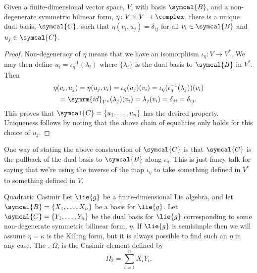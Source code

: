 \documentclass[fleqn]{NotesClass}
\newcommand{\id}{\symrm{id}}
\newcommand{\basis}{\symcal{B}}
\begin{document}
    \begin{lma}{}{}
        Given a finite-dimensional vector space, \(V\), with basis \(\basis\), and a non-degenerate symmetric bilinear form, \(\eta \colon V\times V \to \complex\), there is a unique dual basis, \(\symcal{C}\), such that \(\eta(v_i, u_j) = \delta_{ij}\) for all \(v_i \in \basis\) and \(u_j \in \symcal{C}\).
        \begin{proof}
            Non-degeneracy of \(\eta\) means that we have an isomorphism \(\iota_\eta \colon V \to V^*\).
            We may then define \(u_i = \iota_\eta^{-1}(\lambda_i)\) where \(\{\lambda_i\}\) is the dual basis to \(\basis\) in \(V^*\).
            Then
            \begin{multline}
                \eta(v_i, u_j) = \eta(u_j, v_i) = \iota_\eta(u_j)(v_i) = \iota_\eta(\iota_\eta^{-1}(\lambda_j))(v_i)\\
                = \id_{V^*}(\lambda_j)(v_i) = \lambda_j(v_i) = \delta_{ji} = \delta_{ij}.  
            \end{multline}
            This proves that \(\symcal{C} = \{u_1, \dotsc, u_n\}\) has the desired property.
            Uniqueness follows by noting that the above chain of equalities only holds for this choice of \(u_j\).
        \end{proof}
    \end{lma}
    
    One way of stating the above construction of \(\symcal{C}\) is that \(\symcal{C}\) is the pullback of the dual basis to \(\basis\) along \(\iota_\eta\).
    This is just fancy talk for saying that we're using the inverse of the map \(\iota_\eta\) to take something defined in \(V^*\) to something defined in \(V\).
    
    \begin{dfn}{Quadratic Casimir}{}
        Let \(\lie{g}\) be a finite-dimensional Lie algebra, and let \(\basis = \{X_1, \dotsc, X_n\}\) be a basis for \(\lie{g}\).
        Let \(\symcal{C} = \{Y_1, \dotsc, Y_n\}\) be the dual basis for \(\lie{g}\) corresponding to some non-degenerate symmetric bilinear form, \(\eta\).
        If \(\lie{g}\) is semisimple then we will assume \(\eta = \kappa\) is the Killing form, but it is always possible to find such an \(\eta\) in any case.
        The , \(\Omega\), is the Casimir element defined by
        \begin{equation}
            \Omega_2 = \sum_{i=1}^{n} X_i Y_i.
        \end{equation}
    \end{dfn}
     
\end{document}
